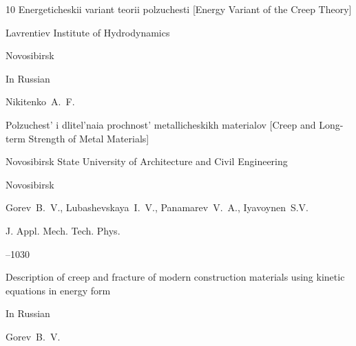 \begin{thebibliography}{10}
\book Energeticheskii variant teorii polzuchesti \rm [Energy Variant of the Creep Theory]


\publ Lavrentiev Institute of Hydrodynamics

\publaddr Novosibirsk





















\lang In Russian

\by Nikitenko~A.~F.

\book Polzuchest' i dlitel'naia prochnost' metallicheskikh materialov \rm [Creep and Long-term Strength of Metal Materials]


\publ Novosibirsk State University of Architecture and Civil Engineering

\publaddr Novosibirsk











\by Gorev~B.~V., Lubashevskaya~I.~V., Panamarev~V.~A., Iyavoynen~S.V.

\jour J. Appl. Mech. Tech. Phys. 






–1030 

\paper Description of creep and fracture of modern construction materials using kinetic equations in energy form








\lang In Russian

\by  Gorev~B.~V.


\end{thebibliography}
